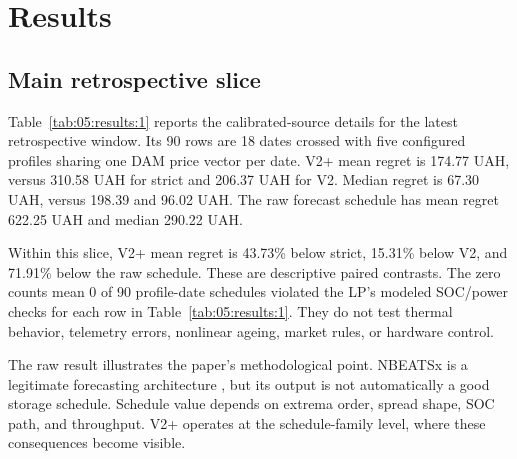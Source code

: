 \section{Results}

\subsection{Main retrospective slice}

Table~\ref{tab:05:results:1} reports the calibrated-source details for the latest retrospective window. Its 90 rows are 18 dates crossed with five configured profiles sharing one DAM price vector per date. V2+ mean regret is 174.77 UAH, versus 310.58 UAH for strict and 206.37 UAH for V2. Median regret is 67.30 UAH, versus 198.39 and 96.02 UAH. The raw forecast schedule has mean regret 622.25 UAH and median 290.22 UAH.

\begin{table}[t]
\centering
\caption{Calibrated-source DAM comparison on the main retrospective window (18 dates $\times$ five configured profiles).}
\label{tab:05:results:1}
\small
{}
\end{table}

Within this slice, V2+ mean regret is 43.73\% below strict, 15.31\% below V2, and 71.91\% below the raw schedule. These are descriptive paired contrasts. The zero counts mean 0 of 90 profile-date schedules violated the LP's modeled SOC/power checks for each row in Table~\ref{tab:05:results:1}. They do not test thermal behavior, telemetry errors, nonlinear ageing, market rules, or hardware control.

The raw result illustrates the paper's methodological point. NBEATSx is a legitimate forecasting architecture \cite{olivares2023nbeatsx}, but its output is not automatically a good storage schedule. Schedule value depends on extrema order, spread shape, SOC path, and throughput. V2+ operates at the schedule-family level, where these consequences become visible.

